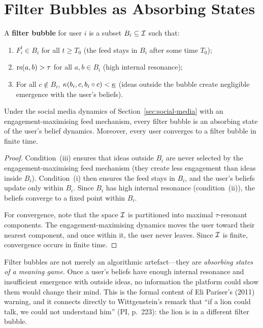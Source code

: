 \section{Filter Bubbles as Absorbing States}
\label{sec:filter-bubbles}

\begin{definition}
\label{def:filter-bubble}
A \textbf{filter bubble} for user $i$ is a subset $B_i \subseteq \mathcal{I}$
such that:
\begin{enumerate}[label=(\roman*)]
  \item $F_i^t \in B_i$ for all $t \ge T_0$ (the feed stays in $B_i$
    after some time $T_0$);
  \item $\mathrm{rs}(a, b) > \tau$ for all $a, b \in B_i$ (high internal
    resonance);
  \item For all $c \notin B_i$, $\kappa(b_i, c, b_i \circ c) <
    \underline{\kappa}$ (ideas outside the bubble create negligible
    emergence with the user's beliefs).
\end{enumerate}
\end{definition}

\begin{theorem}
\label{thm:filter-absorbing}
Under the social media dynamics of Section~\ref{sec:social-media}
with an engagement-maximising feed mechanism, every filter bubble
is an absorbing state of the user's belief dynamics.  Moreover,
every user converges to a filter bubble in finite time.
\end{theorem}

\begin{proof}
Condition~(iii) ensures that ideas outside $B_i$ are never selected
by the engagement-maximising feed mechanism (they create less
engagement than ideas inside $B_i$).  Condition~(i) then ensures
the feed stays in $B_i$, and the user's beliefs update only
within $B_i$.  Since $B_i$ has high internal resonance (condition~(ii)),
the beliefs converge to a fixed point within $B_i$.

For convergence, note that the space $\mathcal{I}$ is partitioned into
maximal $\tau$-resonant components.  The engagement-maximising
dynamics moves the user toward their nearest component, and
once within it, the user never leaves.  Since $\mathcal{I}$ is finite,
convergence occurs in finite time.
\end{proof}

\begin{interpretation}
Filter bubbles are not merely an algorithmic artefact---they
are \emph{absorbing states of a meaning game}.  Once a user's
beliefs have enough internal resonance and insufficient emergence
with outside ideas, no information the platform could show
them would change their mind.  This is the formal content of
Eli Pariser's (2011) warning, and it connects directly to
Wittgenstein's remark that ``if a lion could talk, we could
not understand him'' (PI, p.~223): the lion is in a different
filter bubble.
\end{interpretation}

